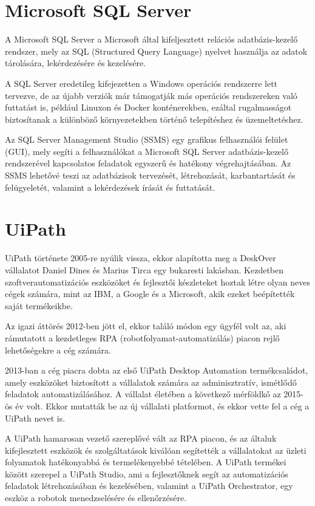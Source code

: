 \documentclass[
]{thesis-ekf}
\theoremstyle{definition}
\theoremstyle{remark}
\begin{document}
\section{Microsoft SQL Server}
A Microsoft SQL Server a Microsoft által kifeljesztett relációs adatbázis-kezelő rendszer, mely az SQL (Structured Query Language) nyelvet használja az adatok tárolására, lekérdezésére és kezelésére. 

A SQL Server eredetileg kifejezetten a Windows operációs rendszerre lett tervezve, de az újabb verziók már támogatják más operációs rendszereken való futtatást is, például Linuxon és Docker konténerekben, ezáltal rugalmasságot biztosítanak a különböző környezetekben történő telepítéshez és üzemeltetéshez.

Az SQL Server Management Studio (SSMS) egy grafikus felhasználói felület (GUI), mely segíti a felhasználókat a Microsoft SQL Server adatbázis-kezelő rendszerével kapcsolatos feladatok egyszerű és hatékony végrehajtásában. Az SSMS lehetővé teszi az adatbázisok tervezését, létrehozását, karbantartását és felügyeletét, valamint a lekérdezések írását és futtatását.
\section{UiPath}
UiPath története 2005-re nyúlik vissza, ekkor alapította meg a DeskOver vállalatot Daniel Dines és Marius Tirca egy bukaresti lakásban. Kezdetben szoftverautomatizációs eszközöket és fejlesztői készleteket hoztak létre olyan neves cégek számára, mint az IBM, a Google és a Microsoft, akik ezeket beépítették saját termékeikbe. 

Az igazi áttörés 2012-ben jött el, ekkor találó módon egy ügyfél volt az, aki rámutatott a kezdetleges RPA (robotfolyamat-automatizálás) piacon rejlő lehetőségekre a cég számára.

2013-ban a cég piacra dobta az első UiPath Desktop Automation termékcsaládot, amely eszközöket biztosított a vállalatok számára az adminisztratív, ismétlődő feladatok automatizálásához. A vállalat életében a következő mérföldkő az 2015-ös év volt. Ekkor mutatták be az új vállalati platformot, és ekkor vette fel a cég a UiPath nevet is.

A UiPath hamarosan vezető szereplővé vált az RPA piacon, és az általuk kifejlesztett eszközök és szolgáltatások kiválóan segítették a vállalatokat az üzleti folyamatok hatékonyabbá és termelékenyebbé tételében. A UiPath termékei között szerepel a UiPath Studio, ami a fejlesztőknek segít az automatizációs feladatok létrehozásában és kezelésében, valamint a UiPath Orchestrator, egy eszköz a robotok menedzselésére és ellenőrzésére.
\end{document}
